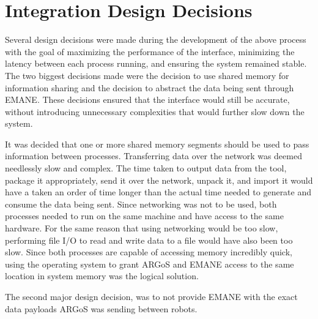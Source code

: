 \section{Integration Design Decisions}
Several design decisions were made during the development of the above process with the goal of maximizing the performance of the interface, minimizing the latency between each process running, and ensuring the system remained stable.
The two biggest decisions made were the decision to use shared memory for information sharing and the decision to abstract the data being sent through EMANE.
These decisions ensured that the interface would still be accurate, without introducing unnecessary complexities that would further slow down the system.\par 
It was decided that one or more shared memory segments should be used to pass information between processes.
Transferring data over the network was deemed needlessly slow and complex.
The time taken to output data from the tool, package it appropriately, send it over the network, unpack it, and import it would have a taken an order of time longer than the actual time needed to generate and consume the data being sent.
Since networking was not to be used, both processes needed to run on the same machine and have access to the same hardware.
For the same reason that using networking would be too slow, performing file I/O to read and write data to a file would have also been too slow.
Since both processes are capable of accessing memory incredibly quick, using the operating system to grant ARGoS and EMANE access to the same location in system memory was the logical solution.\par
The second major design decision, was to not provide EMANE with the exact data payloads ARGoS was sending between robots.

